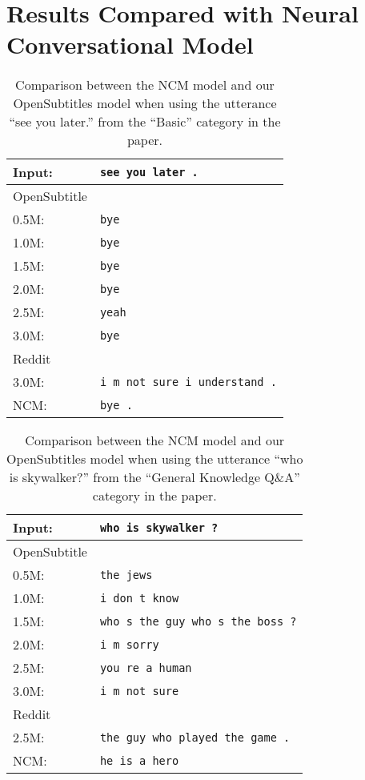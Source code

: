 \chapter{Results Compared with Neural Conversational Model}
\label{apendix:results:compared_with_NCM}
\begin{table}[H]
	\centering
	\begin{adjustbox}{max width=\textwidth}
		\begin{tabular}{ll}
			\toprule
			Input: 	& \texttt{see you later .}\\
			\midrule
			OpenSubtitle\\
			0.5M: 	& \texttt{bye}\\
			1.0M: 	& \texttt{bye}\\
			1.5M:	& \texttt{bye}\\
			2.0M:	& \texttt{bye}\\
			2.5M:	& \texttt{yeah}\\
			3.0M:	& \texttt{bye}\\
			\midrule
			Reddit\\
			3.0M:	& \texttt{i m not sure i understand .}\\
			\midrule
			NCM:	& \texttt{bye .}\\
			\bottomrule
		\end{tabular}
	\end{adjustbox}
	\caption{Comparison between the NCM model and our OpenSubtitles model when using the utterance ``see you later.'' from the ``Basic'' category in the paper.}
	\label{results:example15_output:Neural_Conversational_Model_compared}
\end{table}

\begin{table}[H]
	\centering
	\begin{adjustbox}{max width=\textwidth}
		\begin{tabular}{ll}
			\toprule
			Input: 	& \texttt{who is skywalker ?}\\
			\midrule
			OpenSubtitle\\
			0.5M: 	& \texttt{the jews}\\
			1.0M: 	& \texttt{i don t know}\\
			1.5M:	& \texttt{who s the guy who s the boss ?}\\
			2.0M:	& \texttt{i m sorry}\\
			2.5M:	& \texttt{you re a human}\\
			3.0M:	& \texttt{i m not sure}\\
			\midrule
			Reddit\\
			2.5M:	& \texttt{the guy who played the game .}\\
			\midrule
			NCM:	& \texttt{he is a hero }\\
			\bottomrule
		\end{tabular}
	\end{adjustbox}
	\caption{Comparison between the NCM model and our OpenSubtitles model when using the utterance ``who is skywalker?'' from the ``General Knowledge Q\&A'' category in the paper.}
	\label{results:example16_output:Neural_Conversational_Model_compared}
\end{table}

